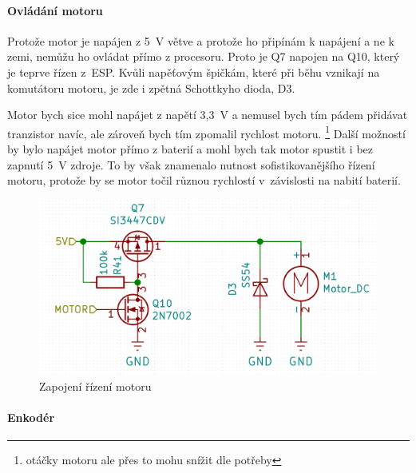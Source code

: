 \paragraph{Ovládání motoru}
Protože motor je napájen z 5~V větve a protože ho připínám k napájení a ne k zemi, nemůžu ho ovládat přímo z procesoru. Proto je Q7 napojen na Q10, který je teprve řízen z~ESP. 
Kvůli napěťovým špičkám, které při běhu vznikají na komutátoru motoru, je zde i zpětná Schottkyho dioda, D3.

Motor bych sice mohl napájet z napětí 3,3~V a nemusel bych tím pádem přidávat tranzistor navíc, ale zároveň bych tím zpomalil rychlost motoru.
\footnote{otáčky motoru ale přes to mohu snížit dle potřeby}
Další možností by bylo napájet motor přímo z baterií a mohl bych tak motor spustit i bez zapnutí 5~V zdroje. To by však znamenalo nutnost 
sofistikovanějšího řízení motoru, protože by se motor točil různou rychlostí v~závislosti na nabití baterií.

\begin{figure}[htbp]
    \centering
    \includegraphics[width=\textwidth]{kapitoly/obrazky/E4/ir_motor_enkoder/ovladani_motoru.png}
    \caption{Zapojení řízení motoru}
    \label{fig:E4-motor}
\end{figure}

\paragraph{Enkodér}

